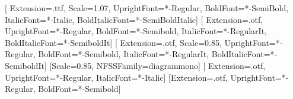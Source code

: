 
\usepackage[paperwidth=504bp, paperheight=661.5bp,
            textwidth=378bp, inner=63bp, top=66bp, textheight=523bp,
            headheight=12bp, headsep=23bp, footskip=34bp]{geometry}

\usepackage{fix-cm}   %
\usepackage{fontspec}
\setmainfont{CrimsonPro}[
  Extension=.ttf, Scale=1.07,
  UprightFont=*-Regular, BoldFont=*-SemiBold,
  ItalicFont=*-Italic,   BoldItalicFont=*-SemiBoldItalic]
\setsansfont{SourceSans3}[
  Extension=.otf,
  UprightFont=*-Regular,  BoldFont=*-Semibold,
  ItalicFont=*-RegularIt, BoldItalicFont=*-SemiboldIt]
\setmonofont{SourceCodePro}[
  Extension=.otf, Scale=0.85,
  UprightFont=*-Regular,  BoldFont=*-Semibold,
  ItalicFont=*-RegularIt, BoldItalicFont=*-SemiboldIt]
\newfontfamily{}[Scale=0.85, NFSSFamily=diagrammono]
\newfontfamily{}[
  Extension=.otf, UprightFont=*-Regular, ItalicFont=*-Italic]
\newfontfamily{}[Extension=.otf, UprightFont=*-Regular, BoldFont=*-Semibold]
\newfontfamily{}

\usepackage{newunicodechar}
\makeatletter
\def\diagram@family{diagrammono}
\newcommand{\sym}[1]{\begingroup\edef\@tempa{\f@family}\edef\@tempb{\ttdefault}%
  \ifx\@tempa\@tempb #1\else\ifx\@tempa\diagram@family #1\else{\symbolfont #1}\fi\fi\endgroup}
\newcommand{\symdv}[1]{\begingroup\edef\@tempa{\f@family}\edef\@tempb{\ttdefault}%
  \ifx\@tempa\@tempb #1\else\ifx\@tempa\diagram@family #1\else{\dejavufont #1}\fi\fi\endgroup}
\makeatother
\providecommand{\BookShared}{../latex}  %

